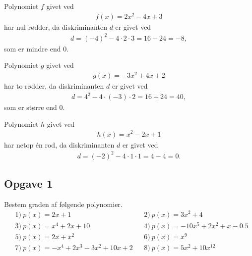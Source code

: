 \begin{exa}
	Polynomiet $f$ givet ved
	\begin{align*}
		f(x) = 2x^2-4x+3
	\end{align*}
	har nul rødder, da diskriminanten $d$ er givet ved
	\begin{align*}
		d = (-4)^2 - 4\cdot 2\cdot 3 = 16-24 = -8,
	\end{align*}
	som er mindre end 0.
\end{exa}
\begin{exa}
	Polynomiet $g$ givet ved
	\begin{align*}
		g(x) = -3x^2 + 4x+2
	\end{align*}
	har to rødder, da diskriminanten $d$ er givet ved
	\begin{align*}
		d = 4^2 -4\cdot (-3)\cdot 2 = 16 + 24 = 40,
	\end{align*}
	som er større end 0.
\end{exa}
\begin{exa}
	Polynomiet $h$ givet ved
	\begin{align*}
		h(x) = x^2 - 2x + 1
	\end{align*}
	har netop én rod, da diskriminanten $d$ er givet ved
	\begin{align*}
		d = (-2)^2 - 4\cdot 1 \cdot 1 = 4 - 4 = 0.
	\end{align*}
\end{exa}

\subsection*{Opgave 1}
Bestem graden af følgende polynomier.
\begin{align*}
	&1) \ p(x) = 2x+1   &      &2) \  p(x) = 3x^2+4      \\
	&3) \ p(x) = x^4+2x+10   &      &4) \ p(x) = -10x^5+2x^2+x-0.5      \\
	&5) \ p(x) = 2x+x^2   &      &6) \ p(x) =  x^9     \\
	&7) \ p(x) = -x^4+2x^3-3x^2+10x+2   &      &8) \ p(x) = 5x^2+10x^{12}     \\	
\end{align*}

